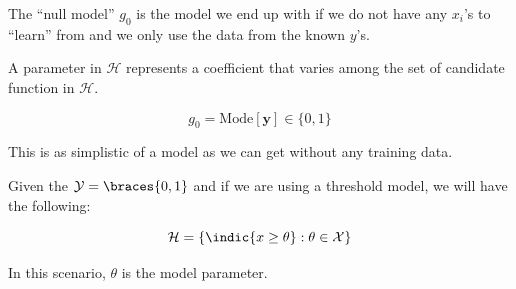 \documentclass[12pt]{article}
\begin{document}
\begin{enumerate}
\begin{tcolorbox}[colback=white, sharp corners]

The ``null model'' $g_0$ is the model we end up with if we do not have any $x_i$'s to ``learn'' from and we only use the data from the known $y$'s.  

\end{tcolorbox}


\begin{tcolorbox}[colback=white, sharp corners]

A parameter in $\mathcal{H}$ represents a coefficient that varies among the set of candidate function in $\mathcal{H}$.

\end{tcolorbox}


\begin{tcolorbox}[colback=white, sharp corners]

\[
	g_0 = \text{Mode}\left[ \mathbf{y} \right] \in \lbrace 0, 1 \rbrace
\]

This is as simplistic of a model as we can get without any training data.

\end{tcolorbox}

\newpage

\begin{tcolorbox}[colback=white, sharp corners]

Given the $\mathcal{Y} = \braces{0,1}$ and if we are using a threshold model, we will have the following: 

\[
	\mathcal{H} = \lbrace \indic{x \geq \theta} : \theta \in \mathcal{X} \rbrace
\]

In this scenario, $\theta$ is the model parameter.


\end{tcolorbox}
\end{enumerate}
\end{document}
